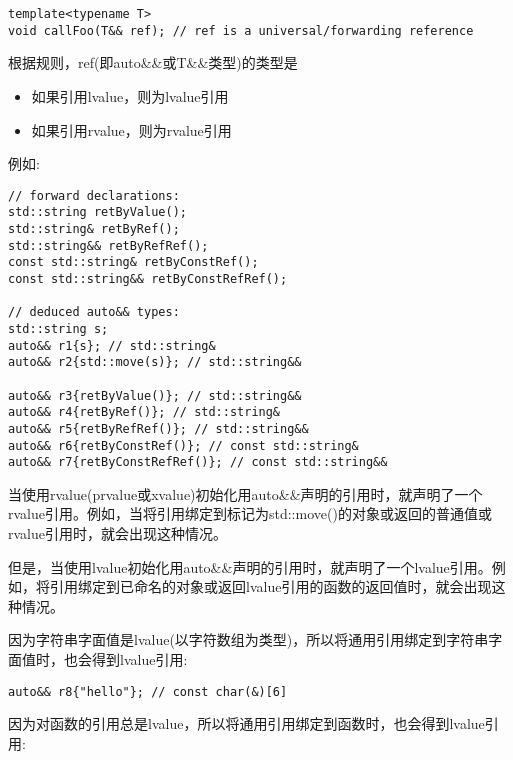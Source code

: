 \begin{lstlisting}[caption={}]
template<typename T>
void callFoo(T&& ref); // ref is a universal/forwarding reference
\end{lstlisting}

根据规则，ref(即auto\&\&或T\&\&类型)的类型是\par

\begin{itemize}
	\item 如果引用lvalue，则为lvalue引用
	\item 如果引用rvalue，则为rvalue引用
\end{itemize}

例如:\par

\begin{lstlisting}[caption={}]
// forward declarations:
std::string retByValue();
std::string& retByRef();
std::string&& retByRefRef();
const std::string& retByConstRef();
const std::string&& retByConstRefRef();

// deduced auto&& types:
std::string s;
auto&& r1{s}; // std::string&
auto&& r2{std::move(s)}; // std::string&&

auto&& r3{retByValue()}; // std::string&&
auto&& r4{retByRef()}; // std::string&
auto&& r5{retByRefRef()}; // std::string&&
auto&& r6{retByConstRef()}; // const std::string&
auto&& r7{retByConstRefRef()}; // const std::string&&
\end{lstlisting}

当使用rvalue(prvalue或xvalue)初始化用auto\&\&声明的引用时，就声明了一个rvalue引用。例如，当将引用绑定到标记为std::move()的对象或返回的普通值或rvalue引用时，就会出现这种情况。\par

但是，当使用lvalue初始化用auto\&\&声明的引用时，就声明了一个lvalue引用。例如，将引用绑定到已命名的对象或返回lvalue引用的函数的返回值时，就会出现这种情况。\par

因为字符串字面值是lvalue(以字符数组为类型)，所以将通用引用绑定到字符串字面值时，也会得到lvalue引用:\par

\begin{lstlisting}[caption={}]
auto&& r8{"hello"}; // const char(&)[6]
\end{lstlisting}

因为对函数的引用总是lvalue，所以将通用引用绑定到函数时，也会得到lvalue引用:\par

